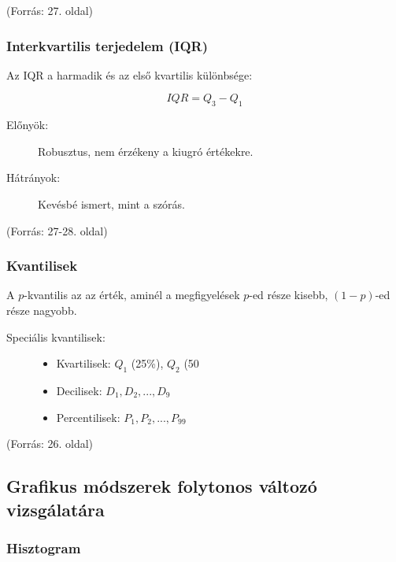 \documentclass[a4paper,12pt]{article}
\begin{document}
(Forrás: 27. oldal)

\subsubsection{Interkvartilis terjedelem (IQR)}

Az IQR a harmadik és az első kvartilis különbsége:

\begin{equation}
IQR = Q_3 - Q_1
\end{equation}

\begin{description}
\item[Előnyök:] Robusztus, nem érzékeny a kiugró értékekre.
\item[Hátrányok:] Kevésbé ismert, mint a szórás.
\end{description}

(Forrás: 27-28. oldal)

\subsubsection{Kvantilisek}

A $p$-kvantilis az az érték, aminél a megfigyelések $p$-ed része kisebb, $(1-p)$-ed része nagyobb.

\begin{description}
\item[Speciális kvantilisek:]
\begin{itemize}
    \item Kvartilisek: $Q_1$ (25\%), $Q_2$ (50%
    \item Decilisek: $D_1, D_2, ..., D_9$
    \item Percentilisek: $P_1, P_2, ..., P_{99}$
\end{itemize}
\end{description}

(Forrás: 26. oldal)

\subsection{Grafikus módszerek folytonos változó vizsgálatára}

\subsubsection{Hisztogram}
\end{document}
